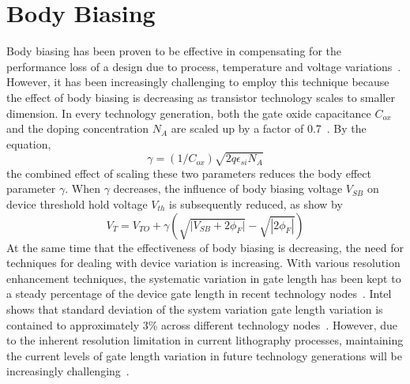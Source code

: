 \section{Body Biasing}
\label{sec:bodybiasing}

Body biasing has been proven to be effective in compensating for the performance loss of a design due to process, temperature and voltage variations~\cite{BodyBiasing}.
However, it has been increasingly challenging to employ this technique because the effect of body biasing is decreasing as transistor technology scales to smaller dimension.
In every technology generation, both the gate oxide capacitance $C_{ox}$ and the doping concentration $N_A$ are scaled up by a factor of 0.7~\cite{Denard}.
By the equation,
\begin{equation}
\gamma = (1/C_{ox})\sqrt{2q\epsilon_{si}N_A}
\end{equation}
the combined effect of scaling these two parameters reduces the body effect parameter $\gamma$. When $\gamma$ decreases, the influence of body biasing voltage $V_{SB}$ on device threshold hold voltage $V_{th}$ is subsequently reduced, as show by
\begin{equation}
V_{T} = V_{TO} + \gamma ( \sqrt{ | {V_{SB} + 2\phi_{F} | } } - \sqrt{ | 2\phi_{F} | } )
\end{equation}
At the same time that the effectiveness of body biasing is decreasing, the need for techniques for dealing with device variation is increasing.
With various resolution enhancement techniques, the systematic variation in gate length has been kept to a steady percentage of the device gate length in recent technology nodes~\cite{Intel:2009}.
Intel shows that standard deviation of the system variation gate length variation is contained to approximately 3\% across different technology nodes~\cite{Intel:2009}.
However, due to the inherent resolution limitation in current lithography processes, maintaining the current levels of gate length variation in future technology generations will be increasingly challenging~\cite{OPC20}.
   

